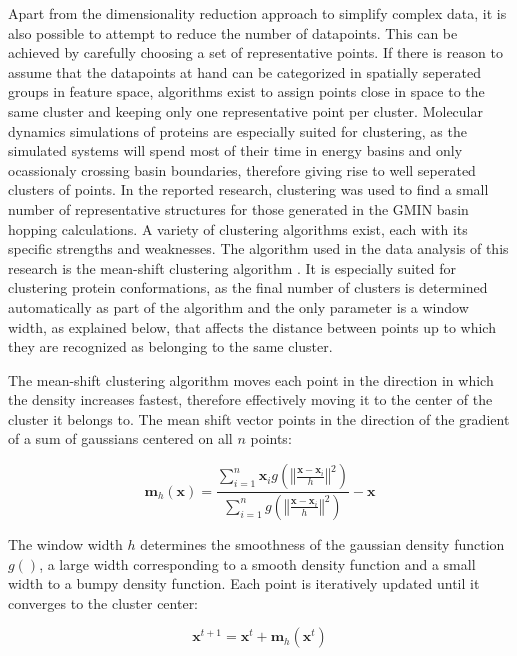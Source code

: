 \documentclass[english, a4paper, 12pt, titlepage, draft]{article}
\newcommand{\vect}[1]{\mathbf{#1}}
\newcommand{\norm}[1]{\left\Vert#1\right\Vert}
\newcommand{\fun}[2]{#1\left(#2\right)}
\begin{document}
Apart from the dimensionality reduction approach to simplify complex data, it is also possible to attempt to reduce the number of datapoints.
This can be achieved by carefully choosing a set of representative points.
If there is reason to assume that the datapoints at hand can be categorized in spatially seperated groups in feature space, algorithms exist to assign points close in space to the same cluster and keeping only one representative point per cluster.
Molecular dynamics simulations of proteins are especially suited for clustering, as the simulated systems will spend most of their time in energy basins and only ocassionaly crossing basin boundaries, therefore giving rise to well seperated clusters of points.
In the reported research, clustering was used to find a small number of representative structures for those generated in the GMIN basin hopping calculations.
A variety of clustering algorithms exist, each with its specific strengths and weaknesses.
The algorithm used in the data analysis of this research is the mean-shift clustering algorithm \cite{meanShift}.
It is especially suited for clustering protein conformations, as the final number of clusters is determined automatically as part of the algorithm and the only parameter is a window width, as explained below, that affects the distance between points up to which they are recognized as belonging to the same cluster.

The mean-shift clustering algorithm moves each point in the direction in which the density increases fastest, therefore effectively moving it to the center of the cluster it belongs to.
The mean shift vector points in the direction of the gradient of a sum of gaussians centered on all $n$ points:

\newcommand{\g}{\fun{g}{\norm{\frac{\vect{x} - \vect{x}_i}{h}}^2}}
\newcommand{\sumi}{\sum_{i=1}^{n}}

\begin{equation}
    \vect{m}_h(\vect{x}) = \frac{\sumi \vect{x}_i \g}{\sumi \g} - \vect{x}
\end{equation}

The window width $h$ determines the smoothness of the gaussian density function $g()$, a large width corresponding to a smooth density function and a small width to a bumpy density function.
Each point is iteratively updated until it converges to the cluster center:

\begin{equation}
    \vect{x}^{t+1} = \vect{x}^t + \vect{m}_h(\vect{x}^t)
\end{equation}
\end{document}
